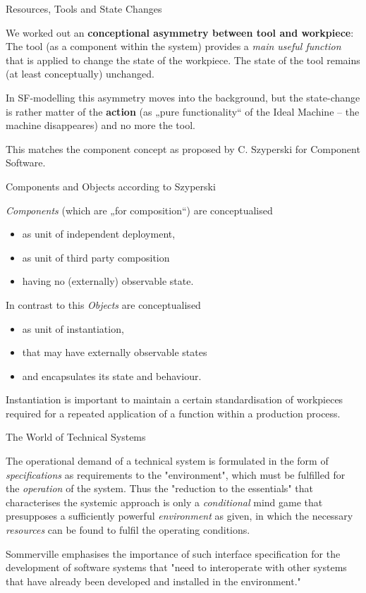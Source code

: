 \documentclass{beamer}
\title{On the Notion of a Resource. Part 2\vskip1em}
\subtitle{Research Seminar in the Module 10-202-2312\\ for Master Computer
  Science}
\author{Prof. Dr. Hans-Gert Gräbe\\
\url{http://www.informatik.uni-leipzig.de/~graebe}}
\date{May 2022}
\begin{document}
{
\begin{frame}
  \titlepage
\end{frame}}

\begin{frame}{Resources, Tools and State Changes} 

We worked out an \textbf{conceptional asymmetry between tool and workpiece}:
The tool (as a component within the system) provides a \emph{main useful
  function} that is applied to change the state of the workpiece. The state of
the tool remains (at least conceptually) unchanged.

In SF-modelling this asymmetry moves into the background, but the state-change
is rather matter of the \textbf{action} (as „pure functionality“ of the Ideal
Machine -- the machine disappeares) and no more the tool.

This matches the component concept as proposed by C. Szyperski for Component
Software.

\end{frame}

\begin{frame}{Components and Objects according to Szyperski}
  
\emph{Components} (which are „for composition“) are conceptualised
\begin{itemize}
\item as unit of independent deployment,
\item as unit of third party composition
\item having no (externally) observable state.
\end{itemize}
In contrast to this \emph{Objects} are conceptualised
\begin{itemize}
\item as unit of instantiation,
\item that may have externally observable states
\item and encapsulates its state and behaviour. 
\end{itemize}
Instantiation is important to maintain a certain standardisation of workpieces
required for a repeated application of a function within a production process.
\end{frame}

\begin{frame}{The World of Technical Systems}

The operational demand of a technical system is formulated in the form of
\emph{specifications} as requirements to the "environment", which must be
fulfilled for the \emph{operation} of the system. Thus the "reduction to the
essentials" that characterises the systemic approach is only a
\emph{conditional} mind game that presupposes a sufficiently powerful
\emph{environment} as given, in which the necessary \emph{resources} can be
found to fulfil the operating conditions.

Sommerville emphasises the importance of such interface specification for the
development of software systems that "need to interoperate with other systems
that have already been developed and installed in the environment."

\end{frame}
\end{document}
